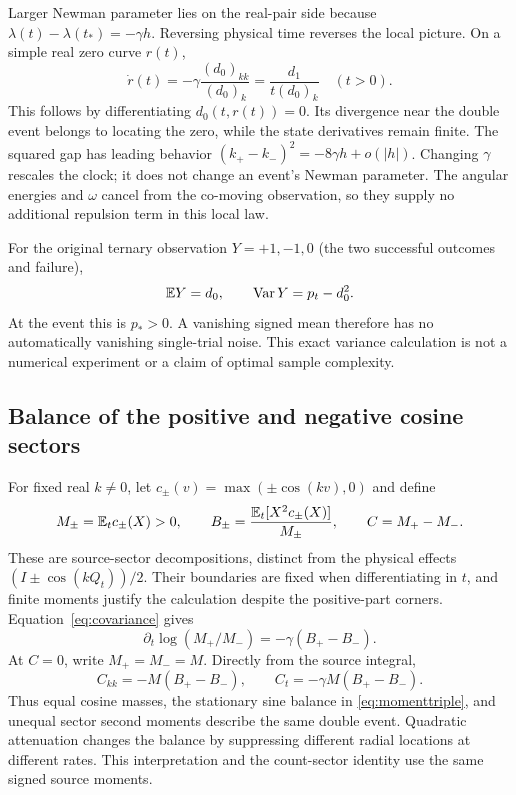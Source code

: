Larger Newman parameter lies on the real-pair side because
$\lambda(t)-\lambda(t_*)=-\gamma h$. Reversing physical time reverses
the local picture. On a simple real zero curve $r(t)$,
\begin{equation}\label{eq:velocity}
 \dot r(t)=-\gamma\frac{(d_0)_{kk}}{(d_0)_k}
          =\frac{d_1}{t(d_0)_k}\quad(t>0).
\end{equation}
This follows by differentiating $d_0(t,r(t))=0$. Its divergence near the
double event belongs to locating the zero, while the state derivatives
remain finite. The squared gap has leading behavior
$(k_+-k_-)^2=-8\gamma h+o(|h|)$. Changing $\gamma$ rescales the clock;
it does not change an event's Newman parameter. The angular energies and
$\omega$ cancel from the co-moving observation, so they supply no additional
repulsion term in this local law.

For the original ternary observation $Y=+1,-1,0$ (the two successful
outcomes and failure),
\begin{equation}\label{eq:variance}
 \mathbb E Y=d_0,\qquad\operatorname{Var} Y=p_t-d_0^2.
\end{equation}
At the event this is $p_*>0$. A vanishing signed mean therefore has no
automatically vanishing single-trial noise. This exact variance calculation
is not a numerical experiment or a claim of optimal sample complexity.

\subsection{Balance of the positive and negative cosine sectors}
For fixed real $k\ne0$, let
$c_\pm(v)=\max(\pm\cos(kv),0)$ and define
\begin{equation}\label{eq:sectors}
 M_\pm=\mathbb E_t c_\pm(X)>0,\qquad
 B_\pm=\frac{\mathbb E_t[X^2c_\pm(X)]}{M_\pm},\qquad C=M_+-M_-.
\end{equation}
These are source-sector decompositions, distinct from the physical effects
$(I\pm\cos(kQ_t))/2$. Their boundaries are fixed when differentiating in
$t$, and finite moments justify the calculation despite the positive-part
corners. Equation~\eqref{eq:covariance} gives
\begin{equation}\label{eq:sectorratio}
 \partial_t\log(M_+/M_-)=-\gamma(B_+-B_-).
\end{equation}
At $C=0$, write $M_+=M_-=M$. Directly from the source integral,
\begin{equation}\label{eq:sectorcurvature}
 C_{kk}=-M(B_+-B_-),\qquad C_t=-\gamma M(B_+-B_-).
\end{equation}
Thus equal cosine masses, the stationary sine balance in
\eqref{eq:momenttriple}, and unequal sector second moments describe the
same double event. Quadratic attenuation changes the balance by suppressing
different radial locations at different rates. This interpretation and the
count-sector identity use the same signed source moments.

